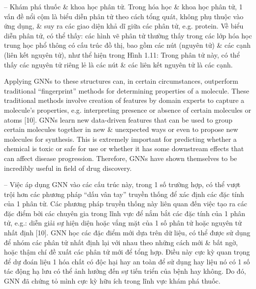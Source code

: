 \documentclass{article}
\begin{document}
\begin{itemize}
\begin{itemize}
\begin{itemize}
            -- {\sf Khám phá thuốc \& khoa học phân tử.} Trong hóa học \& khoa học phân tử, 1 vấn đề nổi cộm là biểu diễn phân tử theo cách tổng quát, không phụ thuộc vào ứng dụng, \& suy ra các giao diện khả dĩ giữa các phân tử, e.g. protein. Về biểu diễn phân tử, có thể thấy: các hình vẽ phân tử thường thấy trong các lớp hóa học trung học phổ thông có cấu trúc đồ thị, bao gồm các nút (nguyên tử) \& các cạnh (liên kết nguyên tử), như thể hiện trong {\sf Hình 1.11: Trong phân tử này, có thể thấy các nguyên tử riêng lẻ là các nút \& các liên kết nguyên tử là các cạnh.}

            Applying GNNs to these structures can, in certain circumstances, outperform traditional ``fingerprint'' methods for determining properties of a molecule. These traditional methods involve creation of features by domain experts to capture a molecule's properties, e.g. interpreting presence or absence of certain molecules or atoms [10]. GNNs learn new data-driven features that can be used to group certain molecules together in new \& unexpected ways or even to propose new molecules for synthesis. This is extremely important for predicting whether a chemical is toxic or safe for use or whether it has some downstream effects that can affect disease progression. Therefore, GNNs have shown themselves to be incredibly useful in field of drug discovery.

            -- Việc áp dụng GNN vào các cấu trúc này, trong 1 số trường hợp, có thể vượt trội hơn các phương pháp ``dấu vân tay'' truyền thống để xác định các đặc tính của 1 phân tử. Các phương pháp truyền thống này liên quan đến việc tạo ra các đặc điểm bởi các chuyên gia trong lĩnh vực để nắm bắt các đặc tính của 1 phân tử, e.g.: diễn giải sự hiện diện hoặc vắng mặt của 1 số phân tử hoặc nguyên tử nhất định [10]. GNN học các đặc điểm mới dựa trên dữ liệu, có thể được sử dụng để nhóm các phân tử nhất định lại với nhau theo những cách mới \& bất ngờ, hoặc thậm chí đề xuất các phân tử mới để tổng hợp. Điều này cực kỳ quan trọng để dự đoán liệu 1 hóa chất có độc hại hay an toàn để sử dụng hay liệu nó có 1 số tác động hạ lưu có thể ảnh hưởng đến sự tiến triển của bệnh hay không. Do đó, GNN đã chứng tỏ mình cực kỳ hữu ích trong lĩnh vực khám phá thuốc.


\end{itemize}
\end{itemize}
\end{itemize}
\end{document}
